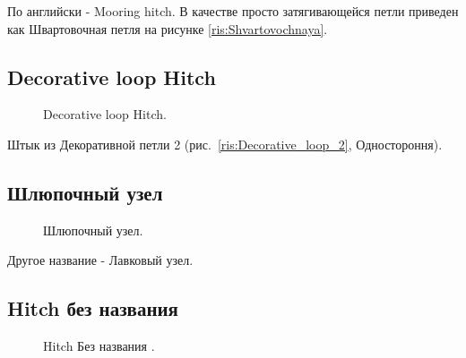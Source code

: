 По английски - Mooring hitch. В качестве просто затягивающейся петли приведен как Швартовочная петля на рисунке \ref{ris:Shvartovochnaya}.

\subsection{Decorative loop Hitch}

\begin{figure}[H]\centering
	\begin{minipage}{1\linewidth}
		\begin{center}
			\tcbox[enhanced jigsaw,colframe=black,opacityframe=0.5,opacityback=0.5]
			{\centering{}}
		\end{center}
	\end{minipage}
\caption{Decorative loop Hitch.}
\label{ris:Decorative_loop_hitch}
\end{figure}

Штык из Декоративной петли 2 (рис.~\ref{ris:Decorative_loop_2}, Одностороння). %

\subsection{Шлюпочный узел}

\begin{figure}[H]\centering
	\begin{minipage}{1\linewidth}
		\begin{center}
			\tcbox[enhanced jigsaw,colframe=black,opacityframe=0.5,opacityback=0.5]
			{\centering{}}
		\end{center}
	\end{minipage}
\caption{Шлюпочный узел.}
\label{ris:Shlupochny}
\end{figure}

Другое название - Лавковый узел.

\addtocounter{HitchNoName}{1}

\subsection{Hitch без названия }

\begin{figure}[H]\centering
	\begin{minipage}{1\linewidth}
		\begin{center}
			\tcbox[enhanced jigsaw,colframe=black,opacityframe=0.5,opacityback=0.5]
			{\centering{}}
		\end{center}
	\end{minipage}
\caption{Hitch Без названия .}
\label{ris:Hitch_noname}
\end{figure}

